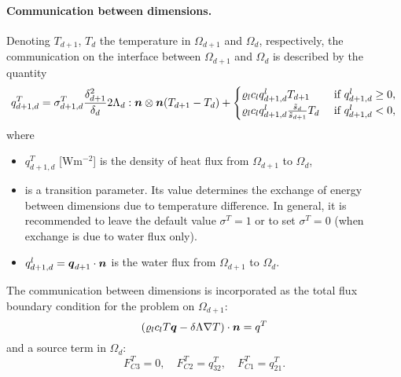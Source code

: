 \paragraph{Communication between dimensions.}
Denoting $T_{d+1}$, $T_d$ the temperature in $\Omega_{d+1}$ and $\Omega_d$, respectively, the communication on the interface between $\Omega_{d+1}$ and $\Omega_d$ is described by the quantity
\begin{equation}
  \label{e:inter_dim_flux_heat}
  q^T_{d+1,d} = \sigma^T_{d+1,d} \frac{\delta_{d+1}^2}{\delta_d}2\Lambda_d:\n\otimes\n ( T_{d+1} - T_d) + \begin{cases} \varrho_l c_l q^l_{d+1,d} T_{d+1} & \mbox{ if }q^l_{d+1,d}\ge 0,\\\varrho_l c_l q^l_{d+1,d} \frac{\tilde s_d}{\tilde s_{d+1}} T_d & \mbox{ if } q^l_{d+1,d}<0,\end{cases}
\end{equation}
where
\begin{itemize}
\item $q^T_{d+1,d}$ [W$\mathrm{m}^{-2}$] is the density of heat flux from $\Omega_{d+1}$ to $\Omega_d$,
\item {} \units{}{}{} is a transition parameter.
Its value determines the exchange of energy between dimensions due to temperature difference.
In general, it is recommended to leave the default value $\sigma^T=1$ or to set $\sigma^T=0$ (when exchange is due to water flux only).
\item $q^l_{d+1,d}=\mathbf{\boldsymbol{q}}_{d+1}\cdot\mathbf{\boldsymbol{n}}$ is the water flux from $\Omega_{d+1}$ to $\Omega_d$.
\end{itemize}
The communication between dimensions is incorporated as the total flux boundary condition for the problem on $\Omega_{d+1}$:
\begin{equation}
\label{e:heat_FC}
\left(\varrho_l c_l T \vc q - \delta\Lambda\nabla T\right)\cdot\vc n = q^T
\end{equation}
and a source term in $\Omega_d$:
\begin{equation}
F^T_{C3} = 0,\quad
F^T_{C2} = q^T_{32},\quad
F^T_{C1} = q^T_{21}.
\end{equation}




